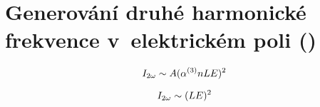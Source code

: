 \chapter[\EFISH]{Generování druhé harmonické frekvence
	v~elektrickém poli (\EFISH)}
\label{sec:efishth}

\begin{equation}
	\label{eq:efishth-prop}
	I_{2\omega} \sim A (\alpha^{(3)} n L E)^2
\end{equation}

\begin{equation}
	\label{eq:efishth-prop-simple}
	I_{2\omega} \sim (L E)^2
\end{equation}

